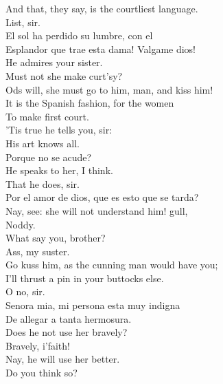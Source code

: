 \documentclass[a4paper,oneside]{memoir}
\begin{document}
\begin{drama*}
And that, they say, is the courtliest language.\\
\facespeaks {} List, sir.\\
\surlyspeaks El sol ha perdido su lumbre, con el\\
Esplandor que trae esta dama! Valgame dios!\\
\facespeaks He admires your sister.\\
\kastrilspeaks {} Must not she make curt'sy?\\
\subtlespeaks Ods will, she must go to him, man, and kiss him!\\
It is the Spanish fashion, for the women\\
To make first court.\\
\facespeaks {} 'Tis true he tells you, sir:\\
His art knows all.\\
\surlyspeaks {} Porque no se acude?\\
\kastrilspeaks He speaks to her, I think.\\
\facespeaks {} That he does, sir.\\
\surlyspeaks Por el amor de dios, que es esto que se tarda?\\
\kastrilspeaks Nay, see: she will not understand him! gull,\\
Noddy.\\
\pliantspeaks {} What say you, brother?\\
\kastrilspeaks {} Ass, my suster.\\
Go kuss him, as the cunning man would have you;\\
I'll thrust a pin in your buttocks else.\\
\facespeaks {} O no, sir.\\
\surlyspeaks Senora mia, mi persona esta muy indigna\\
De allegar a tanta hermosura.\\
\facespeaks Does he not use her bravely?\\
\kastrilspeaks {} Bravely, i'faith!\\
\facespeaks Nay, he will use her better.\\
\kastrilspeaks {} Do you think so?\\

\end{drama*}
\end{document}
